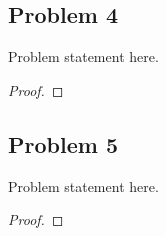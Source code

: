 \documentclass[11pt]{scrartcl}
\begin{document}
\pagebreak








\subsection{Problem 4}

\begin{tcolorbox}[purplebox,title={Problem statement}]
Problem statement here.
\end{tcolorbox}

\begin{claim*}
\end{claim*}

\begin{proof}
\end{proof}

\begin{remark*}
\end{remark*}

\pagebreak








\subsection{Problem 5}

\begin{tcolorbox}[purplebox,title={Problem statement}]
Problem statement here.
\end{tcolorbox}

\begin{claim*}
\end{claim*}

\begin{proof}
\end{proof}

\begin{remark*}
\end{remark*}

\pagebreak
\end{document}
